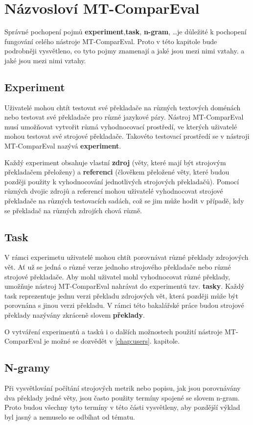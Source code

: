 \chapter{Názvosloví MT-ComparEval}
\label{chap:experiments}

Správné pochopení pojmů \textbf{experiment},\textbf{task}, \textbf{n-gram}, \dots je důležité k pochopení fungování celého nástroje MT-ComparEval.
Proto v této kapitole bude podrobněji vysvětleno,
  co tyto pojmy znamenají a jaké jsou mezi nimi vztahy.
  a jaké jsou mezi nimi vztahy.

\section{Experiment}
Uživatelé mohou chtít testovat své překladače na různých textových doménách
  nebo testovat své překladače pro různé jazykové páry.
Nástroj MT-ComparEval musí umožňovat vytvořit různá vyhodnocovací prostředí,
  ve kterých uživatelé mohou testovat své strojové překladače.
Takovéto testovací prostředí se v nástroji MT-ComparEval nazývá \textbf{experiment}.

Každý experiment obsahuje vlastní \textbf{zdroj} (věty, které mají být strojovým překladačem přeloženy) a
  \textbf{referenci} (člověkem přeložené věty, které budou později použity k vyhodnocování jednotlivých strojových překladačů).
Pomocí různých dvojic zdrojů a referencí mohou uživatelé vyhodnocovat strojové překladače na různých testovacích sadách,
  což se jim může hodit v případě,
  kdy se překladač na různých zdrojích chová různě.

\section{Task}
V rámci experimetu uživatelé mohou chtít porovnávat různé překlady zdrojových vět.
Ať už se jedná o různé verze jednoho strojového překladače nebo různé strojové překladače.
Aby mohl uživatel mohl vyhodnocovat různé překlady,
  umožňuje nástroj MT-ComparEval nahrávat do experimentů tzv. \textbf{tasky}.
Každý task reprezentuje jednu verzi překladu zdrojových vět,
  která později může být porovnána s jinou verzi překladu.
V rámci této bakalářské práce budou strojové překlady nazývány zkráceně slovem \textbf{překlady}.

O vytváření experimentů a tasků i o dalších možnostech použití nástroje MT-ComparEval je možné se dozvědět v \ref{chap:users}. kapitole.

\section{N-gramy}
Při vysvětlování počítání strojových metrik
  nebo popisu, jak jsou porovnávány dva překlady jedné věty,
  jsou často použity termíny spojené se slovem n-gram.
Proto budou všechny tyto termíny v této části vysvětleny,
  aby pozdější výklad byl jasný a nemuselo se odbíhat od tématu.

